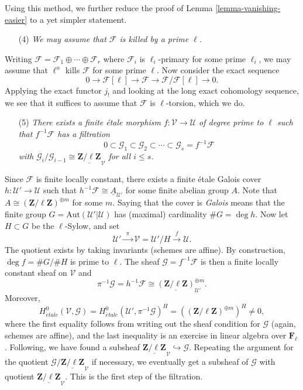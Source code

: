 \medskip\noindent
Using this method, we further reduce the proof of
Lemma \ref{lemma-vanishing-easier}
to a yet simpler statement.
\begin{enumerate}
\item[(4)]
{\it We may assume that $\mathcal{F}$ is killed by a prime $\ell$.}
\end{enumerate}
Writing $\mathcal{F} = \mathcal{F}_1 \oplus \cdots \oplus \mathcal{F}_r$ where
$\mathcal{F}_i$ is $\ell_i$-primary for some prime $\ell_i$, we may assume that
$\ell^n$ kills $\mathcal{F}$ for some prime $\ell$. Now consider the exact
sequence
$$
0 \to \mathcal{F}[\ell] \to \mathcal{F} \to \mathcal{F}/\mathcal{F}[\ell] \to 0.
$$
Applying the exact functor $j_!$ and looking at the long exact cohomology
sequence, we see that it suffices to assume that $\mathcal{F}$ is
$\ell$-torsion, which we do.
\begin{enumerate}
\item[(5)]
{\it There exists a finite \'etale morphism $f: \mathcal{V} \to \mathcal{U}$ of
degree prime to $\ell$ such that $f^{-1} \mathcal{F}$ has a filtration
$$
0 \subset \mathcal{G}_1 \subset \mathcal{G}_2 \subset \cdots \subset
\mathcal{G}_s = f^{-1} \mathcal{F}
$$
with $\mathcal{G}_i /\mathcal{G}_{i-1} \cong
\underline{\mathbf{Z}/\ell\mathbf{Z}}_\mathcal{V}$ for all $i \leq s$.}
\end{enumerate}
Since $\mathcal{F}$ is finite locally constant, there exists a finite \'etale
Galois cover $h : \mathcal{U}' \to \mathcal{U}$ such that $h^{-1} \mathcal{F}
\cong \underline{A}_{\mathcal{U}'}$ for some finite abelian group $A$. Note
that $A \cong (\mathbf{Z}/\ell\mathbf{Z})^{\oplus m}$ for some $m$. Saying that
the cover is {\it Galois} means that the finite group $G =
\text{Aut}(\mathcal{U}' | \mathcal{U})$ has (maximal) cardinality $\# G = \deg
h$. Now let $H \subset G$ be the $\ell$-Sylow, and set
$$
\mathcal{U}' \xrightarrow{\ \ \pi \ \ } \mathcal{V} = \mathcal{U}'/H
\xrightarrow{\ \ f \ \ } \mathcal{U}.
$$
The quotient exists by taking invariants (schemes are affine). By construction,
$\deg f = \#G/\#H$ is prime to $\ell$. The sheaf $\mathcal{G} = f^{-1}
\mathcal{F}$ is then a finite locally constant sheaf on $\mathcal{V}$ and
$$
\pi^{-1} \mathcal{G} = h^{-1}\mathcal{F} \cong
\underline{(\mathbf{Z}/\ell\mathbf{Z})}^{\oplus m}_{\mathcal{U}'}.
$$
Moreover,
$$
H_{\acute{e}tale}^0(\mathcal{V}, \mathcal{G}) =
H_{\acute{e}tale}^0(\mathcal{U}', \pi^{-1}\mathcal{G})^H =
\left((\mathbf{Z}/\ell\mathbf{Z})^{\oplus m}\right)^H \neq 0,
$$
where the first equality follows from writing out the sheaf condition for
$\mathcal{G}$ (again, schemes are affine), and the last inequality is an
exercise in linear algebra over $\mathbf{F}_\ell$. Following, we have found a
subsheaf $\underline{\mathbf{Z}/\ell\mathbf{Z}}_\mathcal{V} \hookrightarrow
\mathcal{G}$. Repeating the argument for the quotient $\mathcal{G}/
\underline{\mathbf{Z}/\ell\mathbf{Z}}_\mathcal{V}$ if necessary, we eventually
get a subsheaf of $\mathcal{G}$ with quotient
$\underline{\mathbf{Z}/\ell\mathbf{Z}}_\mathcal{V}$. This is the first step of
the filtration.

